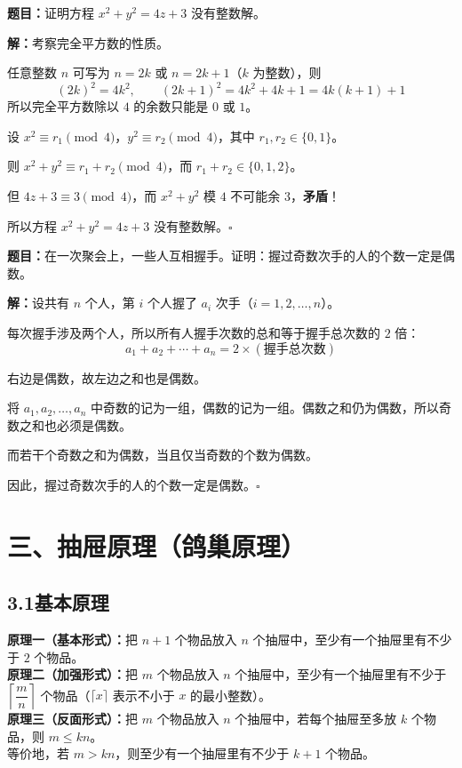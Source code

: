\documentclass[12pt, a4paper]{ctexart}
\begin{document}
\begin{examplebox}
\textbf{题目：}证明方程 $x^2+y^2=4z+3$ 没有整数解。
\end{examplebox}

\textbf{解：}\;考察完全平方数的性质。

任意整数 $n$ 可写为 $n=2k$ 或 $n=2k+1$（$k$ 为整数），则
\[(2k)^2=4k^2,\qquad (2k+1)^2=4k^2+4k+1=4k(k+1)+1\]
所以完全平方数除以 $4$ 的余数只能是 $0$ 或 $1$。

设 $x^2\equiv r_1\pmod{4}$，$y^2\equiv r_2\pmod{4}$，其中 $r_1,r_2\in\{0,1\}$。

则 $x^2+y^2\equiv r_1+r_2\pmod{4}$，而 $r_1+r_2\in\{0,1,2\}$。

但 $4z+3\equiv 3\pmod{4}$，而 $x^2+y^2$ 模 $4$ 不可能余 $3$，\textbf{矛盾}！

所以方程 $x^2+y^2=4z+3$ 没有整数解。\hfill$\square$

\begin{examplebox}
\textbf{题目：}在一次聚会上，一些人互相握手。证明：握过奇数次手的人的个数一定是偶数。
\end{examplebox}

\textbf{解：}\;设共有 $n$ 个人，第 $i$ 个人握了 $a_i$ 次手（$i=1,2,\ldots,n$）。

每次握手涉及两个人，所以所有人握手次数的总和等于握手总次数的 $2$ 倍：
\[a_1+a_2+\cdots+a_n=2\times(\text{握手总次数})\]

右边是偶数，故左边之和也是偶数。

将 $a_1,a_2,\ldots,a_n$ 中奇数的记为一组，偶数的记为一组。偶数之和仍为偶数，所以奇数之和也必须是偶数。

而若干个奇数之和为偶数，当且仅当奇数的个数为偶数。

因此，握过奇数次手的人的个数一定是偶数。\hfill$\square$

\newpage
\section*{\textcolor{mainblue}{三、抽屉原理（鸽巢原理）}}

\subsection*{3.1\quad 基本原理}

\begin{knowledgebox}[抽屉原理]
\textbf{原理一（基本形式）：}把 $n+1$ 个物品放入 $n$ 个抽屉中，至少有一个抽屉里有不少于 $2$ 个物品。\\[6pt]
\textbf{原理二（加强形式）：}把 $m$ 个物品放入 $n$ 个抽屉中，至少有一个抽屉里有不少于 $\left\lceil\dfrac{m}{n}\right\rceil$ 个物品（$\lceil x\rceil$ 表示不小于 $x$ 的最小整数）。\\[6pt]
\textbf{原理三（反面形式）：}把 $m$ 个物品放入 $n$ 个抽屉中，若每个抽屉至多放 $k$ 个物品，则 $m\leqslant kn$。\\[6pt]
等价地，若 $m>kn$，则至少有一个抽屉里有不少于 $k+1$ 个物品。
\end{knowledgebox}
\end{document}
